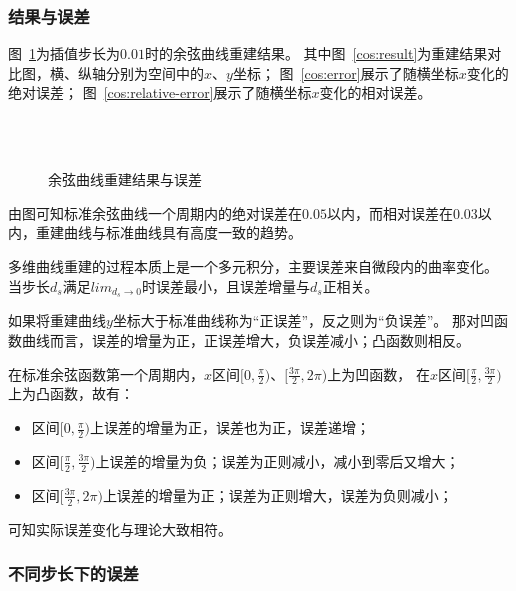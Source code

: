 \subsubsection{结果与误差}
\FloatBarrier
图~\ref{fig:cos}为插值步长为$0.01$时的余弦曲线重建结果。
其中图~\ref{cos:result}为重建结果对比图，横、纵轴分别为空间中的$x$、$y$坐标；
图~\ref{cos:error}展示了随横坐标$x$变化的绝对误差；
图~\ref{cos:relative-error}展示了随横坐标$x$变化的相对误差。

\begin{figure}
\centering
{}\\
\\
\caption{余弦曲线重建结果与误差}
\label{fig:cos}
\end{figure}

由图可知标准余弦曲线一个周期内的绝对误差在$0.05$以内，而相对误差在$0.03$以内，重建曲线与标准曲线具有高度一致的趋势。

多维曲线重建的过程本质上是一个多元积分，主要误差来自微段内的曲率变化。
当步长$d_s$满足$lim_{d_s\rightarrow 0}$时误差最小，且误差增量与$d_s$正相关。

如果将重建曲线$y$坐标大于标准曲线称为“正误差”，反之则为“负误差”。
那对凹函数曲线而言，误差的增量为正，正误差增大，负误差减小；凸函数则相反。

在标准余弦函数第一个周期内，$x$区间$[0, \frac{\pi}{2})$、$[\frac{3\pi}{2}, 2\pi)$上为凹函数，
在$x$区间$[\frac{\pi}{2}, \frac{3\pi}{2})$上为凸函数，故有：

\begin{itemize}
\item 区间$[0, \frac{\pi}{2})$上误差的增量为正，误差也为正，误差递增；
\item 区间$[\frac{\pi}{2}, \frac{3\pi}{2})$上误差的增量为负；误差为正则减小，减小到零后又增大；
\item 区间$[\frac{3\pi}{2}, 2\pi)$上误差的增量为正；误差为正则增大，误差为负则减小；
\end{itemize}

可知实际误差变化与理论大致相符。

\FloatBarrier

\subsubsection{不同步长下的误差}
\FloatBarrier

